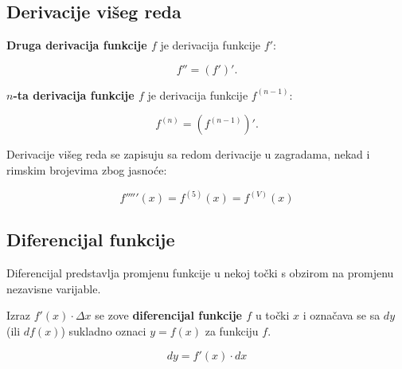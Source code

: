 \subsection{Derivacije višeg reda}

\begin{definition}
    \textbf{Druga derivacija funkcije $f$} je derivacija funkcije $f'$:

    \begin{equation*}
        f'' = (f')'.
    \end{equation*}

    \textbf{$n$-ta derivacija funkcije $f$} je derivacija funkcije $f^{(n-1)}$:

    \begin{equation*}
        f^{(n)} = \left(f^{(n-1)}\right)'.
    \end{equation*}
\end{definition}

Derivacije višeg reda se zapisuju sa redom derivacije u zagradama, nekad i rimskim
brojevima zbog jasnoće:

$$
f'''''(x) = f^{(5)}(x) = f^{(V)}(x)
$$

\subsection{Diferencijal funkcije}

Diferencijal predstavlja promjenu funkcije u nekoj točki s obzirom na promjenu nezavisne varijable.

\begin{definition}
    Izraz $f'(x)\cdot\Delta x$ se zove \textbf{diferencijal funkcije $f$} u točki
    $x$ i označava se sa $dy$ (ili $df(x)$) sukladno oznaci $y=f(x)$ za funkciju $f$.

    \begin{equation*}
        dy = f'(x)\cdot dx
    \end{equation*}
\end{definition}

